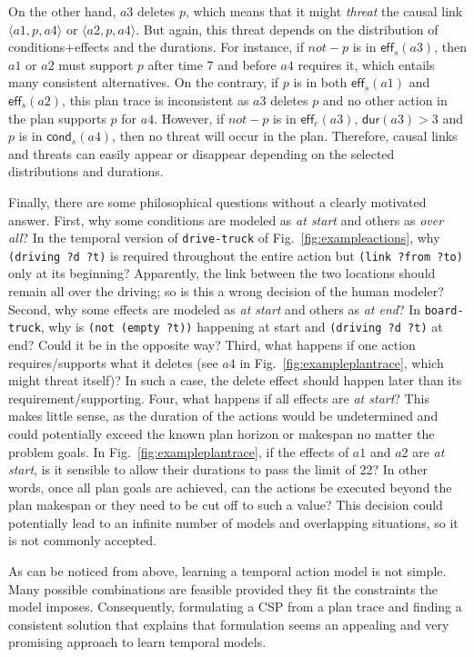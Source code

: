 \documentclass[runningheads]{llncs}
\newcommand{\tup}[1]{{\langle #1 \rangle}}
\newcommand{\eff}{\mathsf{eff}}    %
\newcommand{\cond}{\mathsf{cond}}  %
\newcommand{\dur}{\mathsf{dur}}    %
\begin{document}
On the other hand, $a3$ deletes $p$, which means that it might \emph{threat} the causal link $\tup{a1,p,a4}$ or $\tup{a2,p,a4}$. But again, this threat depends on the distribution of conditions+effects and the durations. For instance, if $not-p$ is in $\eff_s(a3)$, then $a1$ or $a2$ must support $p$ after time 7 and before $a4$ requires it, which entails many consistent alternatives. On the contrary, if $p$ is in both $\eff_s(a1)$ and $\eff_s(a2)$, this plan trace is inconsistent as $a3$ deletes $p$ and no other action in the plan supports $p$ for $a4$. However, if $not-p$ is in $\eff_e(a3)$, $\dur(a3) > 3$ and $p$ is in $\cond_s(a4)$, then no threat will occur in the plan. Therefore, causal links and threats can easily appear or disappear depending on the selected distributions and durations.

Finally, there are some philosophical questions without a clearly motivated answer. First, why some conditions are modeled as \emph{at start} and others as \emph{over all}? In the temporal version of \texttt{drive-truck} of Fig.~\ref{fig:exampleactions}, why \texttt{(driving ?d ?t)} is required throughout the entire action but \texttt{(link ?from ?to)} only at its beginning? Apparently, the link between the two locations should remain all over the driving; so is this a wrong decision of the human modeler?
Second, why some effects are modeled as \emph{at start} and others as \emph{at end}? In \texttt{board-truck}, why is \texttt{(not (empty ?t))} happening at start and \texttt{(driving ?d ?t)} at end? Could it be in the opposite way?
Third, what happens if one action requires/supports what it deletes (see $a4$ in Fig.~\ref{fig:exampleplantrace}, which might threat itself)? In such a case, the delete effect should happen later than its requirement/supporting.
Four, what happens if all effects are \emph{at start}? This makes little sense, as the duration of the actions would be undetermined and could potentially exceed the known plan horizon or makespan no matter the problem goals. In Fig.~\ref{fig:exampleplantrace}, if the effects of $a1$ and $a2$ are \emph{at start}, is it sensible to allow their durations to pass the limit of 22? In other words, once all plan goals are achieved, can the actions be executed beyond the plan makespan or they need to be cut off to such a value? This decision could potentially lead to an infinite number of models and overlapping situations, so it is not commonly accepted.

As can be noticed from above, learning a temporal action model is not simple. Many possible combinations are feasible provided they fit the constraints the model imposes. Consequently, formulating a CSP from a plan trace and finding a consistent solution that explains that formulation seems an appealing and very promising approach to learn temporal models.
\end{document}
